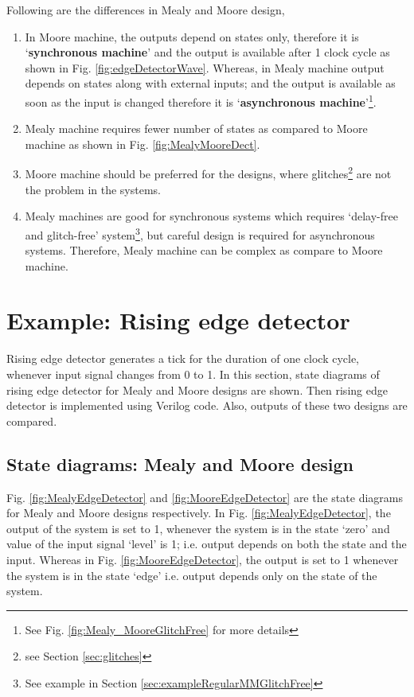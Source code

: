 \begin{noNumBox}
	Following are the differences in Mealy and Moore design, 
	\begin{enumerate}
		\item In Moore machine, the outputs depend on states only, therefore it is `\textbf{synchronous machine}' and the output is available after 1 clock cycle as shown in Fig. \ref{fig:edgeDetectorWave}. Whereas, in Mealy machine output depends on states along with external inputs; and the output is available as soon as the input is changed therefore it is `\textbf{asynchronous machine}'\footnote{See Fig. \ref{fig:Mealy_MooreGlitchFree} for more details}.
		\item Mealy machine requires fewer number of states as compared to Moore machine as shown in Fig. \ref{fig:MealyMooreDect}. 	
		\item Moore machine should be preferred for the designs, where glitches\footnote{see Section \ref{sec:glitches}} are not the problem in the systems. 
		\item Mealy machines are good for synchronous systems which requires `delay-free and glitch-free' system\footnote{See example in Section \ref{sec:exampleRegularMMGlitchFree}}, but careful design is required for asynchronous systems. Therefore, Mealy machine can be complex as compare to Moore machine. 
	\end{enumerate}
\end{noNumBox}	

\section{Example: Rising edge detector}
Rising edge detector generates a tick for the duration of one clock cycle, whenever input signal changes from 0 to 1. In this section, state diagrams of rising edge detector for Mealy and Moore designs are shown. Then rising edge detector is implemented using Verilog code. Also, outputs of these two designs are compared. 

\subsection{State diagrams: Mealy and Moore design}
Fig. \ref{fig:MealyEdgeDetector} and \ref{fig:MooreEdgeDetector} are the state diagrams for Mealy and Moore designs respectively. In Fig. \ref{fig:MealyEdgeDetector}, the output of the system is set to 1, whenever the system is in the state `zero' and value of the input signal `level' is 1; i.e. output depends on both the state and the input. Whereas in Fig. \ref{fig:MooreEdgeDetector}, the output is set to 1 whenever the system is in the state `edge' i.e. output depends only on the state of the system. 

